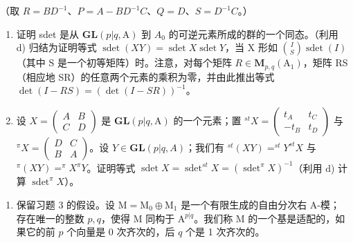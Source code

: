 （取 \(R = BD^{-1}\)、\(P = A - BD^{-1}C\)、\(Q = D\)、\(S = D^{-1}C\)。）

\begin{enumerate}
\def\labelenumi{\alph{enumi})}
\setcounter{enumi}{4}
\tightlist
\item
  证明 sdet 是从 \(\mathbf{GL}(p|q,\mathrm{A})\) 到 \(A_{0}\) 的可逆元素所成的群的一个同态。（利用 d) 归结为证明等式 \(\operatorname{sdet}(XY)=\operatorname{sdet}X\operatorname{sdet}Y\)，当 X 形如 \(\binom{I}{S}\operatorname{sdet}(I)\)（其中 S 是一个初等矩阵）时。注意，对每个矩阵 \(R\in\mathbf{M}_{p,q}(\mathrm{A}_{1})\)，矩阵 RS（相应地 SR）的任意两个元素的乘积为零，并由此推出等式 \(\det(I-RS)=(\det(I-SR))^{-1}\)。
\item
  设 \(X = \begin{pmatrix} A & B \\ C & D \end{pmatrix}\) 是 \(\mathbf{GL}(p|q,\mathrm{A})\) 的一个元素；置 \(^{st}X = \begin{pmatrix} t_{A} & t_{C} \\ -t_{B} & t_{D} \end{pmatrix}\) 与 \(^{\pi}X = \begin{pmatrix} D & C \\ B & A \end{pmatrix}\)。设 \(Y \in \mathbf{GL}(p|q, A)\)；我们有 \(^{st}(XY) = ^{st}Y^{st}X\) 与 \(^{\pi}(XY) = ^{\pi}X^{\pi}Y\)。证明等式 \(\operatorname{sdet}X = \operatorname{sdet}^{st}X = (\operatorname{sdet}^{\pi}X)^{-1}\)（利用 d) 计算 \(\operatorname{sdet}^{\pi}X\)）。
\end{enumerate}

\begin{enumerate}
\def\labelenumi{\arabic{enumi})}
\setcounter{enumi}{3}
\tightlist
\item
  保留习题 3 的假设。设 \(\mathrm{M} = \mathrm{M}_0 \oplus \mathrm{M}_1\) 是一个有限生成的自由分次右 A-模；存在唯一的整数 \(p, q\)，使得 \(\mathrm{M}\) 同构于 \(\mathrm{A}^{p|q}\)。我们称 \(\mathrm{M}\) 的一个基是适配的，如果它的前 \(p\) 个向量是 0 次齐次的，后 \(q\) 个是 1 次齐次的。
\end{enumerate}

